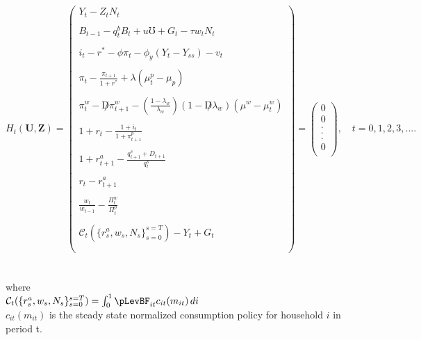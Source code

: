 \documentclass[titlepage]{\econtex}\providecommand{\texname}{BufferStockTheory}
\begin{document}
$$
H_{t}(\mathbf{U},\mathbf{Z})= \begin{pmatrix} 
 Y_{t} - Z_{t}N_{t} \\ \\ 
B_{t-1} - q^{b}_{t}B_{t} + u\mho + G_{t} - \tau w_{t} N_{t} \\ \\  
i_{t} - r^{*} - \phi \pi_{t} -\phi_{y}(Y_{t}-Y_{ss}) - v_{t} \\ \\
\pi_{t} -\frac{\pi_{t+1}}{1+r^{*}} + \lambda(\mu_{t}^{p} -\mu_{p})  \\ \\
 \pi_{t}^{w} -\not D \pi_{t+1}^{w} -(\frac{1-\lambda_{w}}{\lambda_{w}}) (1- \not D \lambda_{w}) (\mu^{w} -\mu_{t}^{w}) \\ \\
    1+r_{t} - \frac{1 + i_{t}}{1+ \pi^{p}_{t+1}}\\ \\
 1+r_{t+1}^{a} - \frac{q_{t+1}^{s} +D_{t+1}}{q_{t}^{s}} \\ \\
 r_{t} - r_{t+1}^{a} \\ \\
 \frac{w_{t}}{w_{t-1}} - \frac{\Pi_{t}^{w}}{\Pi_{t}^{p}} \\ \\
 \mathcal{C}_{t}(\{r_{s}^{a} ,w_{s}, N_{s}\}_{s=0}^{s=T}) - Y_{t} + G_{t}  \\ \\
 \end{pmatrix} = \begin{pmatrix} 0 \\ 0 \\. \\. \\. \\ 0\\ \end{pmatrix} , \quad t=0,1 ,2,3,....
$$ \\ \\
 

 
 where \\
 
 $\mathcal{C}_{t}(\{r_{s}^{a} ,w_{s}, N_{s}\}_{s=0}^{s=T}) = \int_{0}^{1} \pLevBF_{it} c_{it}(m_{it})\, di $ \\
 
$c_{it}(m_{it})$ is the steady state normalized consumption policy for household $i$ in period t. \\ \\
 
\end{document}
